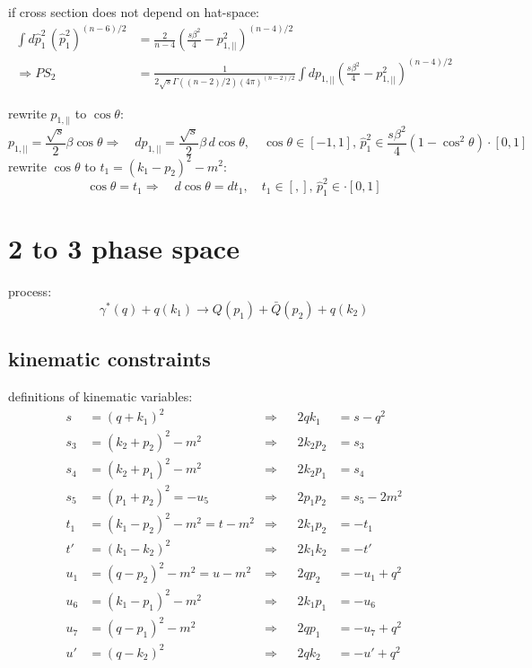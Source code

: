 \documentclass[
  ngerman,		%
  a4paper,		%
  11pt,			%
  DIV=12,		%
  parskip=half  	%
]{scrartcl}
\begin{document}
if cross section does not depend on hat-space:
\begin{align}
\int\!\!d\hat p_1^2\,(\hat p_1^2)^{(n-6)/2} &= \frac 2 {n-4}\left(\frac{s \beta^2}{4}-p_{1,||}^2\right)^{(n-4)/2}\\
\Rightarrow PS_2 &= \frac 1 {2\sqrt s\Gamma((n-2)/2)(4\pi)^{(n-2)/2}}\int\!\!dp_{1,||}\left(\frac{s \beta^2}{4}-p_{1,||}^2\right)^{(n-4)/2}
\end{align}

rewrite $p_{1,||}$ to $\cos\theta$:
\begin{equation}
p_{1,||} = \frac{\sqrt s} 2 \beta\cos\theta \Rightarrow\quad dp_{1,||} = \frac{\sqrt s} 2 \beta\,d\!\cos\theta,\quad \cos\theta\in[-1,1],\, \hat p_1^2 \in \frac{s \beta^2}{4}\left(1-\cos^2\theta\right)\cdot[0,1]
\end{equation}
rewrite $\cos\theta$ to $t_1 = (k_1-p_2)^2-m^2$:
\begin{equation}
\cos\theta = t_1 \Rightarrow\quad d\!\cos\theta = dt_1,\quad t_1\in [,],\, \hat p_1^2 \in \cdot[0,1]
\end{equation}


\section{2 to 3 phase space}

process:
\begin{equation}
\gamma^*(q) + q(k_1) \rightarrow Q(p_1)+\bar{Q}(p_2) + q(k_2)
\end{equation}

\subsection{kinematic constraints}

definitions of kinematic variables:
\begin{align}
s &= (q+k_1)^2 &\Rightarrow& &2qk_1 &= s-q^2\\
s_3 &= (k_2+p_2)^2-m^2  &\Rightarrow& &2k_2p_2 &= s_3\\
s_4 &= (k_2+p_1)^2-m^2  &\Rightarrow& &2k_2p_1 &= s_4\\
s_5 &= (p_1+p_2)^2 = -u_5  &\Rightarrow& &2p_1p_2 &= s_5-2m^2\\
t_1 &= (k_1-p_2)^2-m^2 = t - m^2  &\Rightarrow& &2k_1p_2 &=-t_1\\
t' &= (k_1-k_2)^2  &\Rightarrow& &2k_1k_2 &= -t'\\
u_1 &= (q-p_2)^2-m^2 = u - m^2  &\Rightarrow& &2qp_2 &=-u_1+q^2\\
u_6 &= (k_1-p_1)^2 - m^2  &\Rightarrow& &2k_1p_1 &=-u_6\\
u_7 &= (q-p_1)^2 - m^2  &\Rightarrow& &2qp_1 &=-u_7+q^2\\
u' &= (q-k_2)^2  &\Rightarrow& &2qk_2 &=-u'+q^2
\end{align}
\end{document}
